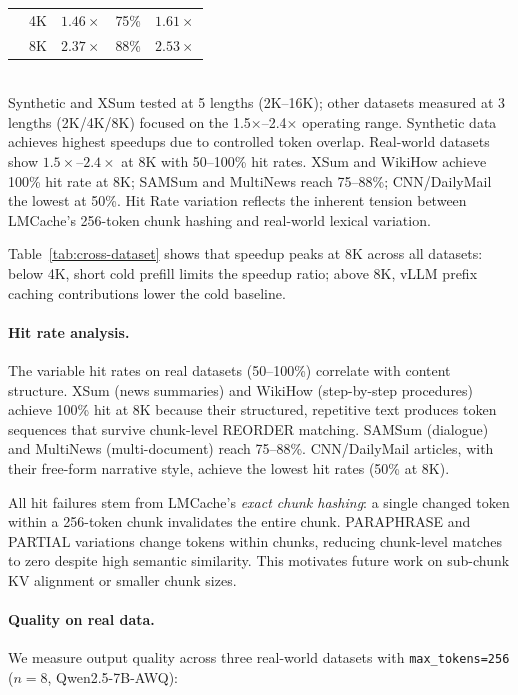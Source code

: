 \documentclass[10pt,twocolumn]{article}
\begin{document}
\begin{table}[t]
{\begin{tabular}{@{}llrrr@{}}
& 4K  & $1.46\times$ &  75\% & $1.61\times$ \\
& 8K  & $2.37\times$ &  88\% & $2.53\times$ \\
\bottomrule
\end{tabular}}\\[2pt]
{\footnotesize Synthetic and XSum tested at 5 lengths (2K--16K);
other datasets measured at 3 lengths (2K/4K/8K) focused on the
1.5×–2.4× operating range. Synthetic data achieves highest speedups
due to controlled token overlap. Real-world datasets show
$1.5\times$--$2.4\times$ at 8K with 50--100\% hit rates. XSum and
WikiHow achieve 100\% hit rate at 8K; SAMSum and MultiNews reach
75--88\%; CNN/DailyMail the lowest at 50\%.
Hit Rate variation reflects the inherent tension between LMCache's
256-token chunk hashing and real-world lexical variation.}
\end{table}

Table~\ref{tab:cross-dataset} shows that speedup peaks at 8K across all
datasets: below 4K, short cold prefill limits the speedup ratio; above
8K, vLLM prefix caching contributions lower the cold baseline.

\paragraph{Hit rate analysis.}
The variable hit rates on real datasets (50--100\%) correlate with
content structure. XSum (news summaries) and WikiHow (step-by-step
procedures) achieve 100\% hit at 8K because their structured,
repetitive text produces token sequences that survive chunk-level
REORDER matching. SAMSum (dialogue) and MultiNews (multi-document)
reach 75--88\%. CNN/DailyMail articles, with their free-form narrative
style, achieve the lowest hit rates (50\% at 8K).

All hit failures stem from LMCache's \emph{exact chunk hashing}: a
single changed token within a 256-token chunk invalidates the entire
chunk. PARAPHRASE and PARTIAL variations change tokens within chunks,
reducing chunk-level matches to zero despite high semantic similarity.
This motivates future work on sub-chunk KV alignment or smaller chunk
sizes.

\paragraph{Quality on real data.}
We measure output quality across three real-world datasets with
\texttt{max\_tokens=256} ($n{=}8$, Qwen2.5-7B-AWQ):
\end{document}
